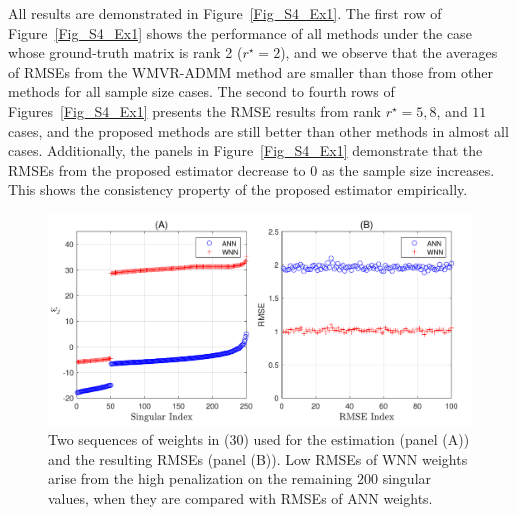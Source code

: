 \documentclass[alpha-refs]{wiley-article}
\begin{document}
All results are demonstrated in Figure~\ref{Fig_S4_Ex1}.
The first row of Figure~\ref{Fig_S4_Ex1} shows the performance of all methods under the case whose ground-truth matrix is rank 2 ($r^{\star} = 2$), and we observe that the averages of RMSEs from the WMVR-ADMM method are smaller than those from other methods for all sample size cases.
The second to fourth rows of Figures~\ref{Fig_S4_Ex1} presents the RMSE results from rank $r^{\star} = 5, 8$, and $11$ cases, and the proposed methods are still better than other methods in almost all cases.
Additionally, the panels in Figure~\ref{Fig_S4_Ex1} demonstrate that the RMSEs from the proposed estimator decrease to $0$ as the sample size increases.
This shows the consistency property of the proposed estimator empirically.

\begin{figure}[b!]
  \includegraphics[width=120mm]{Figure/Fig5.pdf}
  \centering
  \caption{Two sequences of weights in (30) used for the estimation (panel (A)) and the resulting RMSEs (panel (B)). Low RMSEs of WNN weights arise from the high penalization on the remaining $200$ singular values, when they are compared with RMSEs of ANN weights.}
  \label{Fig5}
\end{figure}
\end{document}
